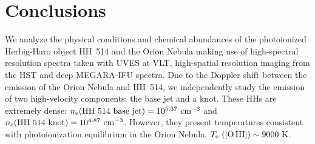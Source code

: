 \documentclass[fleqn,usenatbib]{mnras}
\begin{document}
 







\section{Conclusions}
\label{sec:summary_and_conclusions}
We analyze the physical conditions and chemical abundances of the photoionized Herbig-Haro object HH~514 and the Orion Nebula making use of high-spectral resolution spectra taken with UVES at VLT, high-spatial resolution imaging from the HST and deep MEGARA-IFU spectra.  
Due to the Doppler shift between the emission of the Orion Nebula and HH~514, we independently study the emission of two high-velocity components: the base jet and a knot. These HHs are extremely dense: $n_{\rm e}(\text{HH~514~base jet})=10^{5.37} \text{ cm}^{-3}$ and $n_{\rm e}(\text{HH~514~knot})=10^{4.87} \text{ cm}^{-3}$. However, they present temperatures consistent with  photoionization equilibrium in the Orion Nebula, $T_{\rm e} \text{ ([O\thinspace III])} \sim 9000\text{ K}$.
\end{document}
